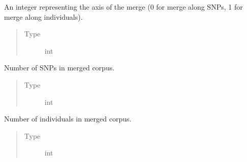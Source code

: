 \documentclass[a4paper,10pt,english]{sphinxhowto}
\begin{document}
\begin{fulllineitems}
\begin{fulllineitems}
\begin{quote}
\begin{description}
\end{description}\end{quote}

\end{fulllineitems}


\begin{fulllineitems}
\label{\detokenize{utils:utils.genotype_corpus_merger.GenotypeCorpusMerger.axis}}
An integer representing the axis of the merge (0 for merge along SNPs, 1 for merge along individuals).
\begin{quote}\begin{description}
\item[{Type}] \leavevmode
int

\end{description}\end{quote}

\end{fulllineitems}


\begin{fulllineitems}
\label{\detokenize{utils:utils.genotype_corpus_merger.GenotypeCorpusMerger.num_snps}}
Number of SNPs in merged corpus.
\begin{quote}\begin{description}
\item[{Type}] \leavevmode
int

\end{description}\end{quote}

\end{fulllineitems}


\begin{fulllineitems}
\label{\detokenize{utils:utils.genotype_corpus_merger.GenotypeCorpusMerger.num_inds}}
Number of individuals in merged corpus.
\begin{quote}\begin{description}
\item[{Type}] \leavevmode
int


\end{description}
\end{quote}
\end{fulllineitems}
\end{fulllineitems}
\end{document}
